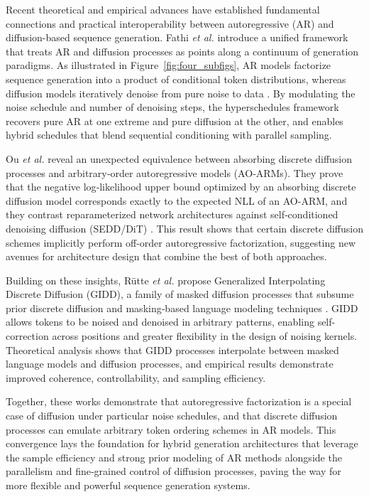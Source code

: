 Recent theoretical and empirical advances have established fundamental connections and practical interoperability between autoregressive (AR) and diffusion-based sequence generation. Fathi \emph{et al.} introduce a unified framework that treats AR and diffusion processes as points along a continuum of generation paradigms. As illustrated in Figure~\ref{fig:four_subfigs}, AR models factorize sequence generation into a product of conditional token distributions, whereas diffusion models iteratively denoise from pure noise to data \cite{fathi_unifying_2025}. By modulating the noise schedule and number of denoising steps, the hyperschedules framework recovers pure AR at one extreme and pure diffusion at the other, and enables hybrid schedules that blend sequential conditioning with parallel sampling.  

Ou \emph{et al.} reveal an unexpected equivalence between absorbing discrete diffusion processes and arbitrary‐order autoregressive models (AO‐ARMs). They prove that the negative log‐likelihood upper bound optimized by an absorbing discrete diffusion model corresponds exactly to the expected NLL of an AO-ARM, and they contrast reparameterized network architectures against self‐conditioned denoising diffusion (SEDD/DiT) \cite{ou_your_2025}. This result shows that certain discrete diffusion schemes implicitly perform off-order autoregressive factorization, suggesting new avenues for architecture design that combine the best of both approaches.

Building on these insights, Rütte \emph{et al.} propose Generalized Interpolating Discrete Diffusion (GIDD), a family of masked diffusion processes that subsume prior discrete diffusion and masking‐based language modeling techniques \cite{rutte_generalized_2025}. GIDD allows tokens to be noised and denoised in arbitrary patterns, enabling self-correction across positions and greater flexibility in the design of noising kernels. Theoretical analysis shows that GIDD processes interpolate between masked language models and diffusion processes, and empirical results demonstrate improved coherence, controllability, and sampling efficiency.

Together, these works demonstrate that autoregressive factorization is a special case of diffusion under particular noise schedules, and that discrete diffusion processes can emulate arbitrary token ordering schemes in AR models. This convergence lays the foundation for hybrid generation architectures that leverage the sample efficiency and strong prior modeling of AR methods alongside the parallelism and fine‐grained control of diffusion processes, paving the way for more flexible and powerful sequence generation systems.

% 
% 
